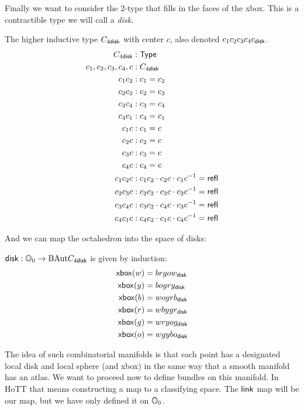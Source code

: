 Finally we want to consider the 2-type that fills in the faces of the xbox. This is a contractible type we will call a \emph{disk}.

\begin{mydef}
The higher inductive type \( C_{4\mathsf{disk}} \) with center \( c \), also denoted \( c_1c_2c_3c_4c_{\mathsf{disk}} \).
\begin{align*}
C_{4\mathsf{disk}} &: \mathsf{Type} \\
c_1, c_2, c_3, c_4, c &: C_{4\mathsf{disk}} \\
c_1c_2 &: c_1 = c_2 \\
c_2c_3 &: c_2 = c_3 \\
c_3c_4 &: c_3 = c_4 \\
c_4c_1 &: c_4 = c_1 \\
c_1c &: c_1 = c \\
c_2c &: c_2 = c \\
c_3c &: c_3 = c \\
c_4c &: c_4 = c \\
c_1c_2c &: c_1c_2\cdot c_2c\cdot c_1c^{-1} = \mathsf{refl} \\
c_2c_3c &: c_2c_2\cdot c_3c\cdot c_2c^{-1} = \mathsf{refl} \\
c_3c_4c &: c_3c_2\cdot c_4c\cdot c_3c^{-1} = \mathsf{refl} \\
c_4c_1c &: c_4c_2\cdot c_1c\cdot c_4c^{-1} = \mathsf{refl}
\end{align*}
\end{mydef}

And we can map the octahedron into the space of disks:

\begin{mydef}
\( \mathsf{disk}:\mathbb{O}_0\to\mathrm{BAut} C_{4\mathsf{disk}} \) is given by induction:
\begin{align*}
\mathsf{xbox}(w) &= brgow_{\mathsf{disk}} \\
\mathsf{xbox}(y) &= bogry_{\mathsf{disk}} \\
\mathsf{xbox}(b) &= woyrb_{\mathsf{disk}} \\
\mathsf{xbox}(r) &= wbygr_{\mathsf{disk}} \\
\mathsf{xbox}(g) &= wryog_{\mathsf{disk}} \\
\mathsf{xbox}(o) &= wgybo_{\mathsf{disk}}
\end{align*}
\end{mydef}

The idea of such combinatorial manifolds is that each point has a designated local disk and local sphere (and xbox) in the same way that a smooth manifold has an atlas. We want to proceed now to define bundles on this manifold. In HoTT that means constructing a map to a classifying space. The \( \mathsf{link} \) map will be our map, but we have only defined it on \( \mathbb{O}_0 \).

